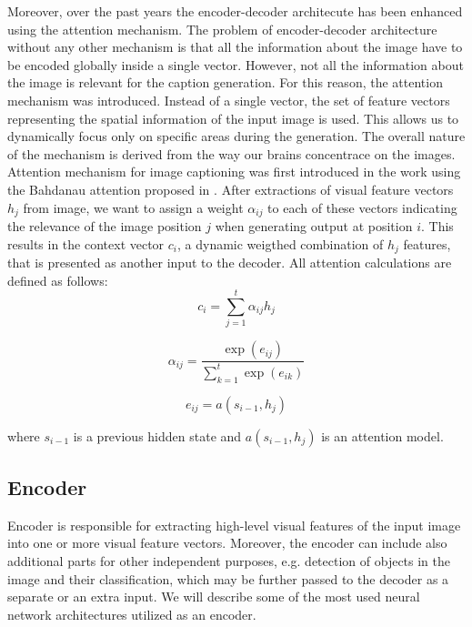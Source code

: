 Moreover, over the past years the encoder-decoder architecute has been enhanced using the attention mechanism. The problem of encoder-decoder architecture without any other mechanism is that all the information about the image have to be encoded globally inside a single vector. However, not all the information about the image is relevant for the caption generation. For this reason, the attention mechanism was introduced. Instead of a single vector, the set of feature vectors representing the spatial information of the input image is used. This allows us to dynamically focus only on specific areas during the generation. The overall nature of the mechanism is derived from the way our brains concentrace on the images.\\

Attention mechanism for image captioning was first introduced in the \citet{xu2015show} work using the Bahdanau attention proposed in \citet{bahdanau2014neural}. After extractions of visual feature vectors $h_j$ from image, we want to assign a weight $\alpha_{ij}$ to each of these vectors indicating the relevance of the image position $j$ when generating output at position $i$. This results in the context vector $c_i$, a dynamic weigthed combination of $h_j$ features, that is presented as another input to the decoder. All attention calculations are defined as follows:
\begin{equation}\label{eq01:AttContext}
	c_i = \sum_{j=1}^{t} \alpha_{ij} h_j
\end{equation}

\begin{equation}\label{eq01:AttWeights}
	\alpha_{ij} = \frac{\exp(e_{ij})}{\sum_{k=1}^{t} \exp(e_{ik})}
\end{equation}

\begin{equation}\label{eq01:AttFeedForwardNetwork}
	e_{ij} = a(s_{i-1}, h_j)
\end{equation}

where $s_{i-1}$ is a previous hidden state and $a(s_{i-1}, h_j)$ is an attention model.

\subsection{Encoder}
Encoder is responsible for extracting high-level visual features of the input image into one or more visual feature vectors. Moreover, the encoder can include also additional parts for other independent purposes, e.g. detection of objects in the image and their classification, which may be further passed to the decoder as a separate or an extra input. We will describe some of the most used neural network architectures utilized as an encoder.

